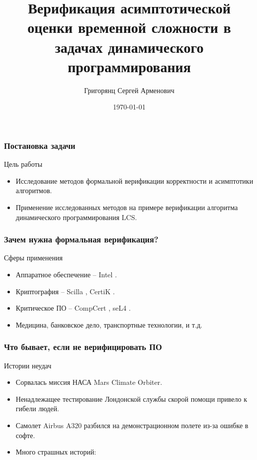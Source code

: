 \documentclass{beamer}
\title[]{Верификация асимптотической оценки временной сложности в задачах динамического программирования} %
\author{Григорянц Сергей Арменович} %
\institute[] %
{Московский физико-технический институт \\
Физтех-школа Прикладной Математики и Информатики \\
Кафедра дискретной математики\\~\\ %
Научный руководитель: Дашков Евгений Владимирович
}
\date{\today} %
\begin{document}
\begin{frame}
	\titlepage
\end{frame}

\begin{frame}
	\frametitle{Постановка задачи}
	\begin{block}{Цель работы}
		\begin{itemize}
			\item<2-> Исследование методов формальной верификации корректности и асимптотики алгоритмов.
			\item<3-> Применение исследованных методов на примере верификации алгоритма динамического программирования LCS.
		\end{itemize}
	\end{block}
\end{frame}

\begin{frame}
	\frametitle{Зачем нужна формальная верификация?}
	\begin{block}{Сферы применения}
		\begin{itemize}
			\item<2-> Аппаратное обеспечение -- Intel \cite{intel}.
			\item<3-> Криптография -- Scilla \cite{Scilla}, CertiK \cite{CertiK}.
			\item<4-> Критическое ПО -- CompCert \cite{CompCert}, seL4 \cite{seL4}.
			\item<5-> Медицина, банковское дело, транспортные технологии, и т.д.
		\end{itemize}
	\end{block}
\end{frame}

\begin{frame}
	\frametitle{Что бывает, если не верифицировать ПО}
	\begin{block}{Истории неудач}
		\begin{itemize}
			\item<2-> Сорвалась миссия НАСА Mars Climate Orbiter.
			\item<3-> Ненадлежащее тестирование Лондонской службы скорой помощи привело к гибели людей.
			\item<4-> Самолет Airbus A320 разбился на демонстрационном полете из-за ошибке в софте.
			\item<5-> Много страшных историй: \cite{horror}
		\end{itemize}
	\end{block}
\end{frame}
\end{document}
